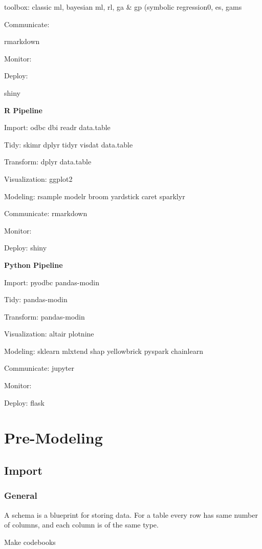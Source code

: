 \documentclass[]{book}
\begin{document}
toolbox: classic ml, bayesian ml, rl, ga \& gp (symbolic regression0, es, gams

Communicate:

rmarkdown

Monitor:

Deploy:

shiny

\textbf{R Pipeline}

Import: odbc dbi readr data.table

Tidy: skimr dplyr tidyr visdat data.table

Transform: dplyr data.table

Visualization: ggplot2

Modeling: rsample modelr broom yardstick caret sparklyr

Communicate: rmarkdown

Monitor:

Deploy: shiny

\textbf{Python Pipeline}

Import: pyodbc pandas-modin

Tidy: pandas-modin

Transform: pandas-modin

Visualization: altair plotnine

Modeling: sklearn mlxtend shap yellowbrick pyspark chainlearn

Communicate: jupyter

Monitor:

Deploy: flask

\hypertarget{pre-modeling-1}{%
\chapter{Pre-Modeling}\label{pre-modeling-1}}

\hypertarget{import}{%
\section{Import}\label{import}}

\hypertarget{general}{%
\subsection{General}\label{general}}

A schema is a blueprint for storing data. For a table every row has same number of columns, and each column is of the same type.

Make codebooks
\end{document}
